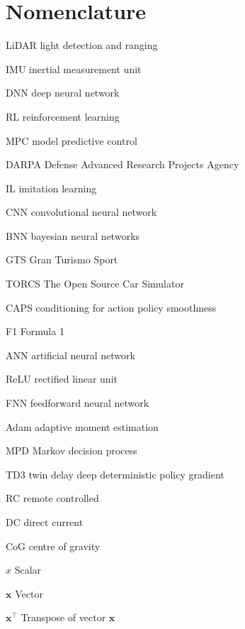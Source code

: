 \chapter{Nomenclature}


\begin{Nomencl}[5em]

    \item[LiDAR]    light detection and ranging
    \item[IMU]      inertial measurement unit
    \item[DNN]      deep neural network
    \item[RL]       reinforcement learning
    \item[MPC]      model predictive control
    \item[DARPA]    Defense Advanced Research Projects Agency
    \item[IL]       imitation learning
    \item[CNN]      convolutional neural network
    \item[BNN]      bayesian neural networks
    \item[GTS]      Gran Turismo Sport
    \item[TORCS]    The Open Source Car Simulator
    \item[CAPS]     conditioning for action policy smoothness
    \item[F1]       Formula 1
    \item[ANN]      artificial neural network
    \item[ReLU]     rectified linear unit
    \item[FNN]      feedforward neural network
    \item[Adam]     adaptive moment estimation
    \item[MPD]      Markov decision process
    \item[TD3]      twin delay deep deterministic policy gradient
    \item[RC]       remote controlled
    \item[DC]       direct current
    \item[CoG]      centre of gravity

    \item[$x$]                      Scalar
    \item[$\bm{x}$]                 Vector
    \item[$\bm{x}^{\intercal}$]     Transpose of vector $\bm{x}$
\end{Nomencl}
\endinput
